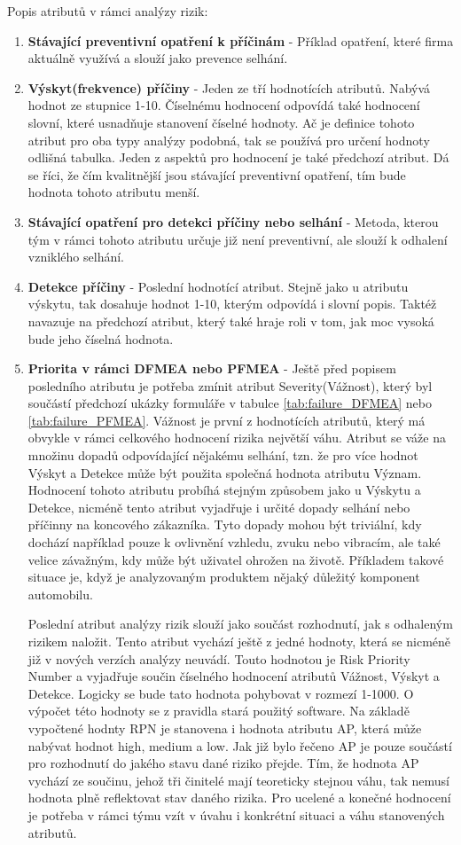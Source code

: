 \newpage
Popis atributů v rámci analýzy rizik:
\begin{enumerate}
	\item \textbf{Stávající preventivní opatření k příčinám} - Příklad opatření, které firma aktuálně využívá a slouží jako prevence selhání. 
	\item \textbf{Výskyt(frekvence) příčiny} - Jeden ze tří hodnotících atributů. Nabývá hodnot ze stupnice 1-10. Číselnému hodnocení odpovídá také hodnocení slovní, které usnadňuje stanovení číselné hodnoty. Ač je definice tohoto atribut pro oba typy analýzy podobná, tak se používá pro určení hodnoty odlišná tabulka. Jeden z aspektů pro hodnocení je také předchozí atribut. Dá se říci, že čím kvalitnější jsou stávající preventivní opatření, tím bude hodnota tohoto atributu menší.     
	\item \textbf{Stávající opatření pro detekci příčiny nebo selhání} - Metoda, kterou tým v rámci tohoto atributu určuje již není preventivní, ale slouží k odhalení vzniklého selhání. 
	\item \textbf{Detekce příčiny} - Poslední hodnotící atribut. Stejně jako u atributu výskytu, tak dosahuje hodnot 1-10, kterým odpovídá i slovní popis. Taktéž navazuje na předchozí atribut, který také hraje roli v tom, jak moc vysoká bude jeho číselná hodnota. 
	\item \textbf{Priorita v rámci DFMEA nebo PFMEA} - 
 Ještě před popisem posledního atributu je potřeba zmínit atribut Severity(Vážnost), který byl součástí předchozí ukázky formuláře v tabulce \ref{tab:failure_DFMEA} nebo \ref{tab:failure_PFMEA}. Vážnost je první z hodnotících atributů, který má obvykle v rámci celkového hodnocení rizika největší váhu. Atribut se váže na množinu dopadů odpovídající nějakému selhání, tzn. že pro více hodnot Výskyt a Detekce může být použita společná hodnota atributu Význam. Hodnocení tohoto atributu probíhá stejným způsobem jako u Výskytu a Detekce, nicméně tento atribut vyjadřuje i určité dopady selhání nebo příčinny na koncového zákazníka. Tyto dopady mohou být triviální, kdy dochází například pouze k ovlivnění vzhledu, zvuku nebo vibracím, ale také velice závažným, kdy může být uživatel ohrožen na životě. Příkladem takové situace je, když je analyzovaným produktem nějaký důležitý komponent automobilu. 
 
 Poslední atribut analýzy rizik slouží jako součást rozhodnutí, jak s odhaleným rizikem naložit. Tento atribut vychází ještě z jedné hodnoty, která se nicméně již v nových verzích analýzy neuvádí. Touto hodnotou je Risk Priority Number a vyjadřuje součin číselného hodnocení atributů Vážnost, Výskyt a Detekce. Logicky se bude tato hodnota pohybovat v rozmezí 1-1000. O výpočet této hodnoty se z pravidla stará použitý software. Na základě vypočtené hodnty RPN je stanovena i hodnota atributu AP, která může nabývat hodnot high, medium a low. Jak již bylo řečeno AP je pouze součástí pro rozhodnutí do jakého stavu dané riziko přejde. Tím, že hodnota AP vychází ze součinu, jehož tři činitelé mají teoreticky stejnou váhu, tak nemusí hodnota plně reflektovat stav daného rizika. Pro ucelené a konečné hodnocení je potřeba v rámci týmu vzít v úvahu i konkrétní situaci a váhu stanovených atributů.
 
\end{enumerate} 
